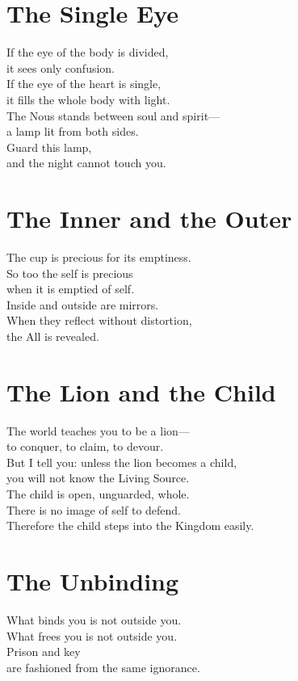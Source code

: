 \documentclass[10pt, openright]{book}
\begin{document}
\section{The Single Eye}
If the eye of the body is divided, \\
it sees only confusion. \\
If the eye of the heart is single, \\
it fills the whole body with light. \\

The Nous stands between soul and spirit— \\
a lamp lit from both sides. \\
Guard this lamp, \\
and the night cannot touch you.

\section{The Inner and the Outer}
The cup is precious for its emptiness. \\
So too the self is precious \\
when it is emptied of self. \\

Inside and outside are mirrors. \\
When they reflect without distortion, \\
the All is revealed.

\section{The Lion and the Child}
The world teaches you to be a lion— \\
to conquer, to claim, to devour. \\
But I tell you: unless the lion becomes a child, \\
you will not know the Living Source. \\

The child is open, unguarded, whole. \\
There is no image of self to defend. \\
Therefore the child steps into the Kingdom easily.

\section{The Unbinding}
What binds you is not outside you. \\
What frees you is not outside you. \\
Prison and key \\
are fashioned from the same ignorance. \\
\end{document}
